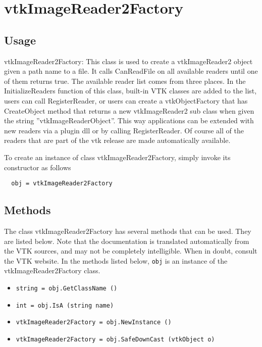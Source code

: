 \section{vtkImageReader2Factory}

\subsection{Usage}

 vtkImageReader2Factory: This class is used to create a vtkImageReader2
 object given a path name to a file.  It calls CanReadFile on all
 available readers until one of them returns true.  The available reader
 list comes from three places.  In the InitializeReaders function of this
 class, built-in VTK classes are added to the list, users can call
 RegisterReader, or users can create a vtkObjectFactory that has
 CreateObject method that returns a new vtkImageReader2 sub class when
 given the string ''vtkImageReaderObject''.  This way applications can be
 extended with new readers via a plugin dll or by calling RegisterReader.
 Of course all of the readers that are part of the vtk release are made
 automatically available.


To create an instance of class vtkImageReader2Factory, simply
invoke its constructor as follows
\begin{verbatim}
  obj = vtkImageReader2Factory
\end{verbatim}
\subsection{Methods}

The class vtkImageReader2Factory has several methods that can be used.
  They are listed below.
Note that the documentation is translated automatically from the VTK sources,
and may not be completely intelligible.  When in doubt, consult the VTK website.
In the methods listed below, \verb|obj| is an instance of the vtkImageReader2Factory class.
\begin{itemize}
\item  \verb|string = obj.GetClassName ()|

\item  \verb|int = obj.IsA (string name)|

\item  \verb|vtkImageReader2Factory = obj.NewInstance ()|

\item  \verb|vtkImageReader2Factory = obj.SafeDownCast (vtkObject o)|

\end{itemize}
